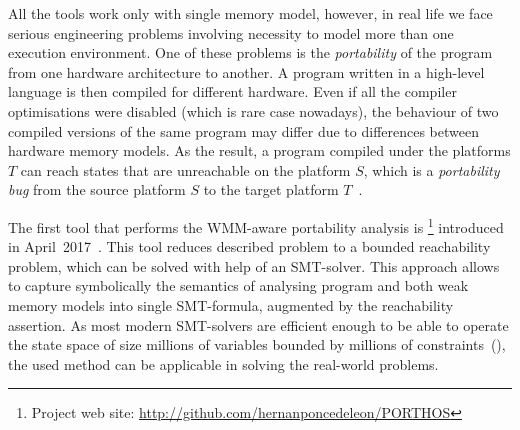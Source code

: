All the  tools work only with single memory model, however, in real life we face serious engineering problems involving necessity to model more than one execution environment. One of these problems is the \textit{portability} of the program from one hardware architecture to another. A program written in a high-level language is then compiled for different hardware. Even if all the compiler optimisations were disabled (which is rare case nowadays), the behaviour of two compiled versions of the same program may differ due to differences between hardware memory models.
As the result, a program compiled under the platforms $T$ can reach states that are unreachable on the platform $S$, which is a \textit{portability bug} from the source platform $S$ to the target platform $T$~\cite{Porthos17SAS}.

The first tool that performs the WMM-aware portability analysis is \porthos%
\footnote{Project web site: \url{http://github.com/hernanponcedeleon/PORTHOS}}%
introduced in April~2017~\cite{Porthos17CoRR}. This tool reduces described problem to a bounded reachability problem, which can be solved with help of an SMT-solver. This approach allows to capture symbolically the semantics of analysing program and both weak memory models into single SMT-formula, augmented by the reachability assertion. As most modern SMT-solvers are efficient enough to be able to operate the state space of size millions of variables bounded by millions of constraints~(\cite{malik2009boolean}), the used method can be applicable in solving the real-world problems.



